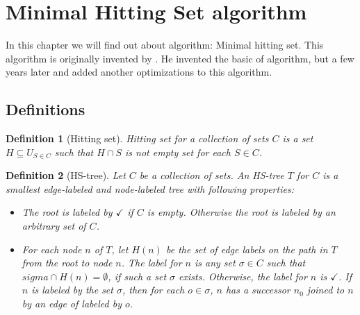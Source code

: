 \documentclass[12pt,a4paper]{article}
\newtheorem{definition}{Definition}[subsection]
\begin{document}
\section{Minimal Hitting Set algorithm}
In this chapter we will find out about algorithm: Minimal hitting set. This algorithm is originally invented by \citep{reiterHS}. He invented the basic of algorithm, but a few years later \citep{greinerReitersCorrection} and \citep{wotawaReitersVariant} added another optimizations to this algorithm.

\subsection{Definitions}

\begin{definition}[Hitting set]
	Hitting set for a collection of sets $C$ is a set $H \subseteq U_{S \in C}$ such that $H \cap S$ is not empty set for each $S \in C$.
\end{definition}

\begin{definition}[HS-tree]
	Let $C$ be a collection of sets. An HS-tree $T$ for $C$ is a smallest edge-labeled and node-labeled tree with following properties:
	
	\begin{itemize}
		\item The root is labeled by $\checkmark$ if $C$ is empty. Otherwise the root is labeled by an arbitrary set of $C$.
		
		\item For each node $n$ of $T$, let $H(n)$ be the set of edge labels on the path in $T$ from the root to node $n$. The label for $n$ is any set $\sigma \in C$ such that $sigma \cap H(n) = \emptyset$, if such a set $\sigma$ exists. Otherwise, the label for $n$ is $\checkmark$. If $n$ is labeled by the set $\sigma$, then for each $o \in \sigma$, $n$ has a successor $n_{0}$ joined to $n$ by an edge of labeled by $o$.
	\end{itemize}
	
\end{definition}
\end{document}
